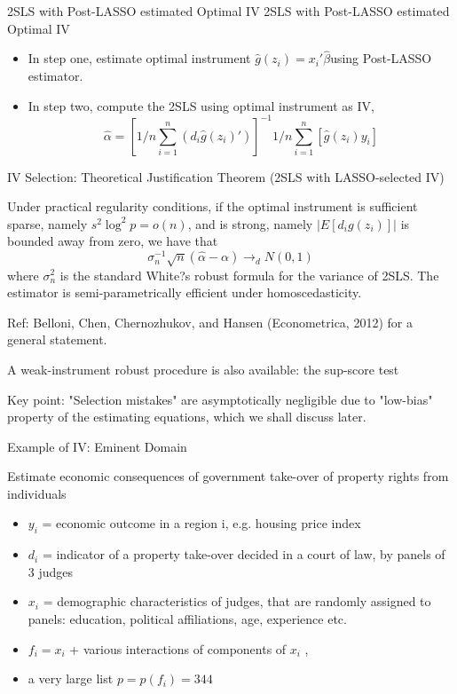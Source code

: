 \documentclass{beamer}
\begin{document}
\begin{frame}{2SLS with Post-LASSO estimated Optimal IV}
	2SLS with Post-LASSO estimated Optimal IV
	\begin{itemize}
		\item In step one, estimate optimal instrument $\hat{g}(z_i) = x_i' \hat{\beta} $using
Post-LASSO estimator.
\item In step two, compute the 2SLS using optimal instrument as IV,
\[ \hat{\alpha}= \left[ 1/n \sum_{i=1}^n (d_i\hat{g}(z_i)') \right]^{-1} 1/n \sum_{i=1}^n [\hat{g}(z_i)y_i] \]
	\end{itemize}
\end{frame}

\begin{frame}{IV Selection: Theoretical Justification}
Theorem (2SLS with LASSO-selected IV)

Under practical regularity conditions, if the optimal instrument is
sufficient sparse, namely $s^2 \log^2 p = o(n)$, and is strong, namely
$|E[d_i g(z_i)]|$ is bounded away from zero, we have that
\[ \sigma_n^{-1} \sqrt{n} (\hat{\alpha}-\alpha) \rightarrow_d N(0,1) \] 
where $\sigma^2_n$ is the standard White?s robust formula for the variance of
2SLS. The estimator is semi-parametrically efficient under
homoscedasticity.

\begin{itemize}
{\tiny
\item Ref: Belloni, Chen, Chernozhukov, and Hansen (Econometrica, 2012)
for a general statement.
\item A weak-instrument robust procedure is also available: the sup-score
test
\item Key point: "Selection mistakes" are asymptotically negligible due to
"low-bias" property of the estimating equations, which we shall discuss
later.}
\end{itemize}
\end{frame}

\begin{frame}{Example of IV: Eminent Domain}
	
	Estimate economic consequences of government take-over of
property rights from individuals
\begin{itemize}
\item $y_i$ = economic outcome in a region i, e.g. housing price index
\item $d_i$ = indicator of a property take-over decided in a court of law,
by panels of 3 judges
\item $x_i$ = demographic characteristics of judges, that are randomly
assigned to panels: education, political affiliations, age,
experience etc.
\item $f_i = x_i$ + various interactions of components of $x_i$ ,
\item a very large list $p = p(f_i) = 344$
\end{itemize}
\end{frame}
\end{document}
